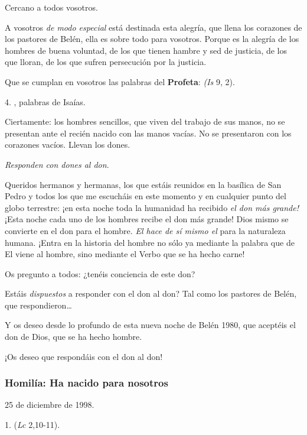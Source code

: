 Cercano a todos vosotros.

A vosotros \emph{de modo especial} está destinada esta alegría, que llena los corazones de los pastores de Belén, ella es sobre todo para vosotros. Porque es la alegría de los hombres de buena voluntad, de los que tienen hambre y sed de justicia, de los que lloran, de los que sufren persecución por la justicia.

Que se cumplan en vosotros las palabras del \textbf{Profeta}:  \emph{(Is} 9, 2).

4. , palabras de Isaías.

Ciertamente: los hombres sencillos, que viven del trabajo de sus manos, no se presentan ante el recién nacido con las manos vacías. No se presentaron con los corazones vacíos. Llevan los dones.

\emph{Responden con dones al don}.

Queridos hermanos y hermanas, los que estáis reunidos en la basílica de San Pedro y todos los que me escucháis en este momento y en cualquier punto del globo terrestre: ¡en esta noche toda la humanidad ha recibido \emph{el don más grande!} ¡Esta noche cada uno de los hombres recibe el don más grande! Dios mismo se convierte en el don para el hombre. \emph{El hace de sí mismo el } para la naturaleza humana. ¡Entra en la historia del hombre no sólo ya mediante la palabra que de El viene al hombre, sino mediante el Verbo que se ha hecho carne!

Os pregunto a todos: ¿tenéis conciencia de este don?

Estáis \emph{dispuestos} a responder con el don al don? Tal como los pastores de Belén, que respondieron\ldots{}

Y os deseo desde lo profundo de esta nueva noche de Belén 1980, que aceptéis el don de Dios, que se ha hecho hombre.

¡Os deseo que respondáis con el don al don!

\subsubsection{Homilía: Ha nacido para nosotros}

25 de diciembre de 1998.

1.  (\emph{Lc} 2,10-11).

